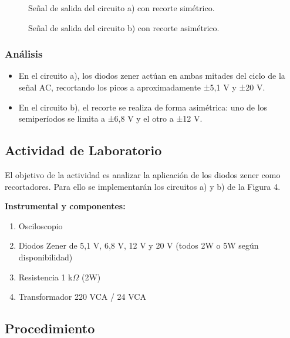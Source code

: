 \begin{figure}[H]
    \centering
    \caption{Señal de salida del circuito a) con recorte simétrico.}
\end{figure}

\begin{figure}[H]
    \centering
    \caption{Señal de salida del circuito b) con recorte asimétrico.}
\end{figure}

\subsubsection*{Análisis}
\begin{itemize}
    \item En el circuito a), los diodos zener actúan en ambas mitades del ciclo de la señal AC, recortando los picos a aproximadamente ±5,1 V y ±20 V.
    \item En el circuito b), el recorte se realiza de forma asimétrica: uno de los semiperíodos se limita a ±6,8 V y el otro a ±12 V.
\end{itemize}

\subsection{Actividad de Laboratorio}

El objetivo de la actividad es analizar la aplicación de los diodos zener como recortadores. Para ello se implementarán los circuitos a) y b) de la Figura 4.

\textbf{Instrumental y componentes:}
\begin{enumerate}
    \item Osciloscopio
    \item Diodos Zener de 5,1 V, 6,8 V, 12 V y 20 V (todos 2W o 5W según disponibilidad)
    \item Resistencia 1 k$\Omega$ (2W)
    \item Transformador 220 VCA / 24 VCA
\end{enumerate}

\subsection*{Procedimiento}

